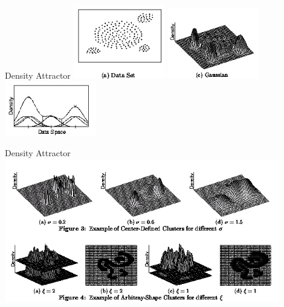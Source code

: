 \begin{frame}{Density Attractor}
	\centering
	\vspace{1cm}
	\includegraphics[width=4cm]{img/densityattractor.png}
	\includegraphics[width=4cm]{img/densityattractor1.png}
	\includegraphics[width=4cm]{img/densityattractor2.png}
\end{frame}

\begin{frame}{Density Attractor}
	\centering
	\includegraphics[width=12cm]{img/densities.png}
\end{frame}